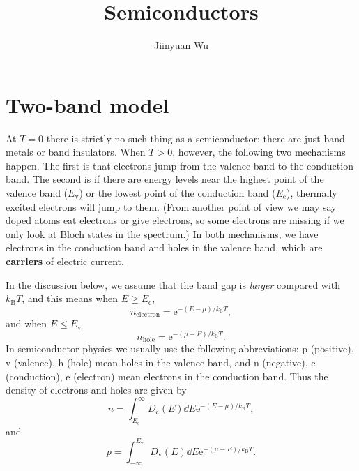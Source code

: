 \documentclass[hyperref, a4paper]{article}
\title{Semiconductors}
\author{Jiinyuan Wu}
\newcommand*{\ee}{\mathrm{e}}
\newcommand*{\concept}[1]{{\textbf{#1}}}
\begin{document}
\maketitle

\section{Two-band model}

At $T = 0$ there is strictly no such thing as a semiconductor:
there are just band metals or band insulators.
When $T > 0$, however, 
the following two mechanisms happen.
The first is that electrons jump from the valence band to the conduction band.
The second is if there are energy levels 
near the highest point of the valence band ($E_{\text{v}}$)
or the lowest point of the conduction band ($E_{\text{c}}$),
thermally excited electrons will jump to them.
(From another point of view we may say doped atoms eat electrons or give electrons,
so some electrons are missing if we only look at Bloch states in the spectrum.)
In both mechanisms,
we have electrons in the conduction band and holes in the valence band,
which are \concept{carriers} of electric current.

In the discussion below, we assume that the band gap is \emph{larger} compared with $k_{\text{B}} T$,
and this means when $E \geq E_{\text{c}}$,
\begin{equation}
    n_{\text{electron}} = \ee^{- (E - \mu) / k_{\text{B}} T},
\end{equation}
and when $E \leq E_{\text{v}}$
\begin{equation}
    n_{\text{hole}} = \ee^{- (\mu - E) / k_{\text{B}} T}.
\end{equation}
In semiconductor physics we usually use the following abbreviations:
p (positive), v (valence), h (hole) mean holes in the valence band,
and n (negative), c (conduction), e (electron) mean electrons in the conduction band.
Thus the density of electrons and holes are given by 
\begin{equation}
    n = \int_{E_\text{c}}^\infty D_{\text{c}} (E) \dd{E} \ee^{- (E - \mu) / k_{\text{B}} T},
\end{equation}
and 
\begin{equation}
    p = \int^{E_{\text{v}}}_{-\infty} D_{\text{v}} (E) \dd{E} \ee^{- (\mu - E) / k_{\text{B}} T}.
\end{equation}
\end{document}
